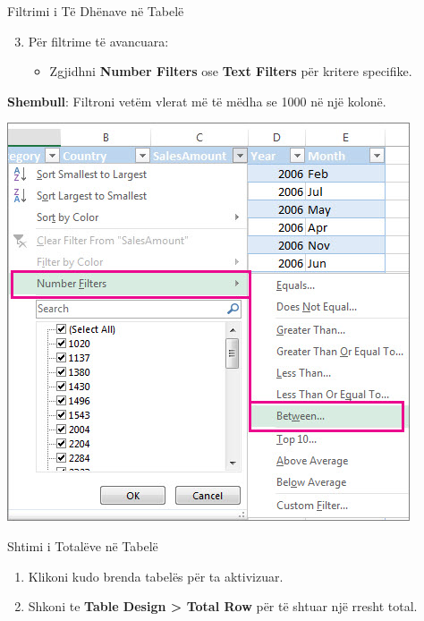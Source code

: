 \documentclass[
  ignorenonframetext,
]{beamer}
\providecommand{\tightlist}{%
  \setlength{\itemsep}{0pt}\setlength{\parskip}{0pt}}
\begin{document}
\begin{frame}{Filtrimi i Të Dhënave në Tabelë}
\label{filtrimi-i-tuxeb-dhuxebnave-nuxeb-tabeluxeb-1}
\begin{enumerate}
\setcounter{enumi}{2}
\item
  Për filtrime të avancuara:

  \begin{itemize}
  \tightlist
  \item
    Zgjidhni \textbf{Number Filters} ose \textbf{Text Filters} për
    kritere specifike.
  \end{itemize}
\end{enumerate}

\textbf{Shembull}: Filtroni vetëm vlerat më të mëdha se 1000 në një
kolonë.

\includegraphics{./images/excel15.jpg}
\end{frame}

\begin{frame}{Shtimi i Totalëve në Tabelë}
\label{shtimi-i-totaluxebve-nuxeb-tabeluxeb}
\begin{enumerate}
\item
  Klikoni kudo brenda tabelës për ta aktivizuar.
\item
  Shkoni te \textbf{Table Design \textgreater{} Total Row} për të shtuar
  një rresht total.
\end{enumerate}
\end{frame}
\end{document}
